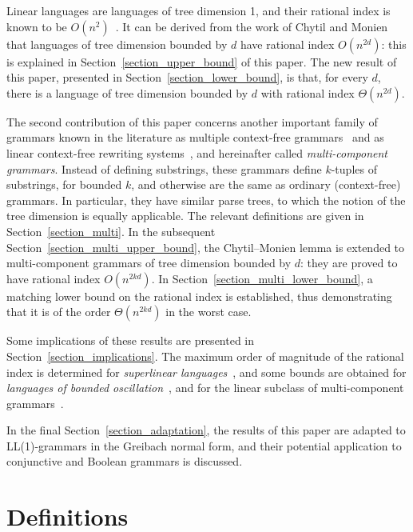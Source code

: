 \documentclass[runningheads]{llncs}
\begin{document}
Linear languages are languages of tree dimension 1,
and their rational index is known to be $O(n^2)$~\cite{RatBasic}.
It can be derived from the work of Chytil and Monien~\cite{ChytilMonien}
that languages of tree dimension bounded by $d$
have rational index $O(n^{2d})$:
this is explained in Section~\ref{section_upper_bound} of this paper.
The new result of this paper, presented in Section~\ref{section_lower_bound},
is that, for every $d$, there is a language of tree dimension bounded by $d$
with rational index $\Theta(n^{2d})$.

The second contribution of this paper concerns
another important family of grammars
known in the literature as multiple context-free grammars~\cite{SekiMatsumuraFujiiKasami}
and as linear context-free rewriting systems~\cite{VijayshankarWeirJoshi},
and hereinafter called \emph{multi-component grammars}.
Instead of defining substrings,
these grammars define $k$-tuples of substrings, for bounded $k$,
and otherwise are the same as ordinary (context-free) grammars.
In particular, they have similar parse trees,
to which the notion of the tree dimension is equally applicable.
The relevant definitions are given in Section~\ref{section_multi}.
In the subsequent Section~\ref{section_multi_upper_bound},
the Chytil--Monien lemma is extended to multi-component grammars
of tree dimension bounded by $d$:
they are proved to have rational index $O(n^{2kd})$.
In Section~\ref{section_multi_lower_bound}, a matching lower bound
on the rational index is established,
thus demonstrating that it is of the order $\Theta(n^{2kd})$ in the worst case.

Some implications of these results
are presented in Section~\ref{section_implications}.
The maximum order of magnitude of the rational index
is determined for \emph{superlinear languages}~\cite{superlinear},
and some bounds are obtained for \emph{languages of bounded oscillation}~\cite{BoundOsc,Wechsung},
and for the linear subclass of multi-component grammars~\cite{Engelfriet1997,KANAZAWA2019104449}.

In the final Section~\ref{section_adaptation},
the results of this paper are adapted to LL(1)-grammars in the Greibach normal form,
and their potential application to conjunctive and Boolean grammars is discussed.







\section{Definitions}\label{section_definitions}
\end{document}
